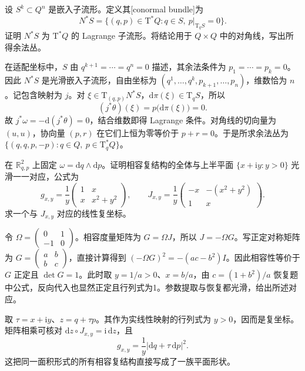 \begin{exercise}\label{g4:ex:0702:conormal}
	设 \(S^k\subset Q^n\) 是嵌入子流形。定义其[conormal bundle]为
	\[
		N^*S=\{(q,p)\in\mathrm{T}^*Q:q\in S,\ p|_{\mathrm{T}_qS}=0\}.
	\]
	证明 \(N^*S\) 为 \(\mathrm{T}^*Q\) 的 Lagrange 子流形。将结论用于 \(Q\times Q\) 中的对角线，写出所得余法丛。
\end{exercise}
\begin{solution}
	在适配坐标中，\(S\) 由 \(q^{k+1}=\cdots=q^n=0\) 描述，其余法条件为 \(p_1=\cdots=p_k=0\)。因此 \(N^*S\) 是光滑嵌入子流形，自由坐标为 \((q^1,\ldots,q^k,p_{k+1},\ldots,p_n)\)，维数恰为 \(n\)。记包含映射为 \(j\)。对 \(\xi\in\mathrm{T}_{(q,p)}N^*S\)，\(\mathrm{d}\pi(\xi)\in\mathrm{T}_qS\)，所以
	\[
		(j^*\theta)(\xi)=p\bigl(\mathrm{d}\pi(\xi)\bigr)=0.
	\]
	故 \(j^*\omega=-\mathrm{d}(j^*\theta)=0\)，结合维数即得 Lagrange 条件。对角线的切向量为 \((u,u)\)，协向量 \((p,r)\) 在它们上恒为零等价于 \(p+r=0\)。于是所求余法丛为 \(\{(q,q,p,-p):q\in Q,\ p\in\mathrm{T}_q^*Q\}\)。
\end{solution}

\begin{exercise}\label{g4:ex:0703:plane-parameters}
	在 \(\mathbb R^2_{q,p}\) 上固定 \(\omega=\mathrm{d}q\wedge\mathrm{d}p\)。证明相容复结构的全体与上半平面 \(\{x+\mathrm{i}y:y>0\}\) 光滑一一对应，公式为
	\[
		g_{x,y}=\frac1y\begin{pmatrix}1&x\\x&x^2+y^2\end{pmatrix},
		\qquad J_{x,y}=\frac1y\begin{pmatrix}-x&-(x^2+y^2)\\1&x\end{pmatrix}.
	\]
	求一个与 \(J_{x,y}\) 对应的线性复坐标。
\end{exercise}
\begin{solution}
	令 \(\Omega=\begin{pmatrix}0&1\\-1&0\end{pmatrix}\)。相容度量矩阵为 \(G=\Omega J\)，所以 \(J=-\Omega G\)。写正定对称矩阵为 \(G=\begin{pmatrix}a&b\\b&c\end{pmatrix}\)，直接计算得到 \((-\Omega G)^2=-(ac-b^2)I\)。因此相容性等价于 \(G\) 正定且 \(\det G=1\)。此时取 \(y=1/a>0\)、\(x=b/a\)，由 \(c=(1+b^2)/a\) 恢复题中公式，反向代入也显然正定且行列式为1。参数提取与恢复都光滑，给出所述对应。

	取 \(\tau=x+\mathrm{i}y\)、\(z=q+\tau p\)。其作为实线性映射的行列式为 \(y>0\)，因而是复坐标。矩阵相乘可核对 \(\mathrm{d}z\circ J_{x,y}=\mathrm{i}\,\mathrm{d}z\)，且
	\[
		g_{x,y}=\frac1y|\mathrm{d}q+\tau\,\mathrm{d}p|^2.
	\]
	这把同一面积形式的所有相容复结构直接写成了一族平面形状。
\end{solution}

